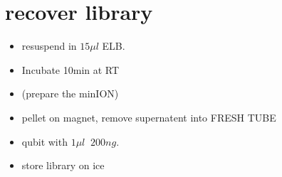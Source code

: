 \documentclass[aps,rmp]{revtex4}
\begin{document}
\section*{recover library}
\begin{itemize}
	\item resuspend in $15\mu l$ ELB.
	\item Incubate 10min at RT
	\item (prepare the minION)
	\item pellet on magnet, remove supernatent into FRESH TUBE
	\item qubit with $1\mu l$ $~200ng$.
	\item store library on ice
\end{itemize}
\end{document}
